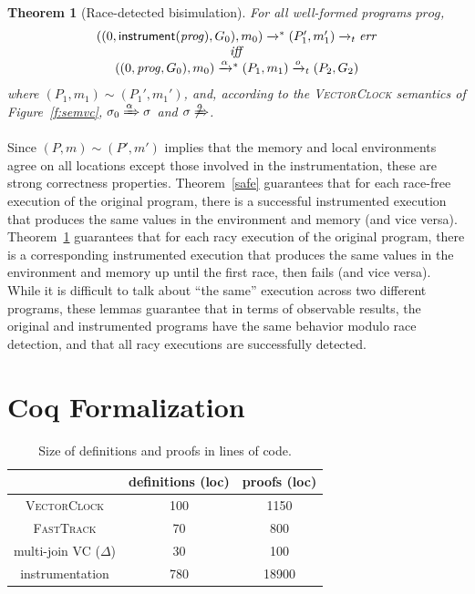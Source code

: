 \documentclass[preprint, 9pt]{sigplanconf}
\newcommand{\VCalg}{\textsc{VectorClock}\xspace}
\newcommand{\FT}{\textsc{FastTrack}\xspace}
\newcommand{\instrp}[1]{\ensuremath{\mathsf{instrument}(#1)}}
\newcommand{\cfg}[2]{\ensuremath{(#1, #2)}}
\newcommand{\execstar}[4]{\ensuremath{\cfg{#1}{#2} \tto{#3} #4}}
\newcommand{\execs}[3]{\ensuremath{ \xrightarrow{#2}_{#1} #3}}
\newcommand{\tto}[1]{\mathrel{
  \vphantom{\xrightarrow{#1}}
  \smash{\xrightarrow{#1}}
  \vphantom{\to}^{*}}
}
\newtheorem{theorem}{Theorem}
\begin{document}
\begin{theorem}[Race-detected bisimulation]\label{race}For all well-formed programs $\mathit{prog}$, 
\[
\begin{array}{c}
\execstar{(0, \instrp{\mathit{prog}}, G_0)}{m_0}{}{(P_1', m_1')} \execs{t}{}{\mathit{err}}\\ 
\mathit{iff} \\ 
\execstar{(0, \mathit{prog}, G_0)}{m_0}{\alpha}{(P_1, m_1)} \execs{t}{o}{(P_2, G_2)}
\end{array}
\]
%
where $(P_1, m_1) \sim (P_1', m_1')$, and, according to the \VCalg semantics of Figure~\ref{f:semvc}, $\sigma_0 \xRightarrow{\alpha} \sigma$ and $\sigma \not\xRightarrow{o}$.

\end{theorem}
Since $(P, m) \sim (P', m')$ implies that the memory and local environments agree on all locations except those involved in the instrumentation, these are strong correctness properties. Theorem~\ref{safe} guarantees that for each race-free execution of the original program, there is a successful instrumented execution that produces the same values in the environment and memory (and vice versa). Theorem~\ref{race} guarantees that for each racy execution of the original program, there is a corresponding instrumented execution that produces the same values in the environment and memory up until the first race, then fails (and vice versa). While it is difficult to talk about ``the same'' execution across two different programs, these lemmas guarantee that in terms of observable results, the original and instrumented programs have the same behavior modulo race detection, and that all racy executions are successfully detected.

\section{Coq Formalization}
\begin{table}[h]
\centering
\begin{tabular}{c || c | c}
& definitions (loc) & proofs (loc)\\
\hline
\VCalg & 100 & 1150\\
\FT & 70 & 800\\
multi-join \textsc{VC} ($\Delta$)& 30 & 100\\
instrumentation & 780 & 18900
\end{tabular}
\caption{Size of definitions and proofs in lines of code.}
\label{tab:loc}
\end{table}
\end{document}
